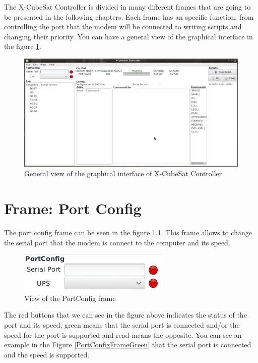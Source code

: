 \documentclass[pdftex,11pt,a4paper,titlepage]{report}
\begin{document}
The X-CubeSat Controller is divided in many different frames that are going to be presented in the following chapters. Each frame has an specific function, from controlling the port that the modem will be connected to writing scripts and changing their priority. You can have a general view of the graphical interface in the figure \ref{GeneralView}.
\begin{figure}[h]
\centering
\includegraphics[scale=0.35]{../images/GeneralView.png}
\caption{General view of the graphical interface of X-CubeSat Controller}
\label{GeneralView}
\end{figure}

\chapter{Frame: Port Config}
\hspace{0.4cm} The port config frame can be seen in the figure \ref{PortConfigFrame}. This frame allows to change the serial port that the modem is connect to the computer and its speed.
\begin{figure}[h]
\centering
\includegraphics[scale=0.9]{../images/PortConfigFrame.png}
\caption{View of the PortConfig frame}
\label{PortConfigFrame}
\end{figure}

The red buttons that we can see in the figure above indicates the status of the port and its speed; green means that the serial port is connected and/or the speed for the port is supported and read means the opposite. You can see an example in the Figure \ref{PortConfigFrameGreen} that the serial port is connected and the speed is supported.
\end{document}
